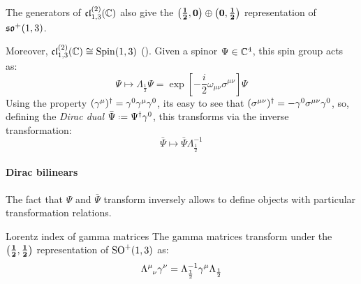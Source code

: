 \begin{proposition}{}{}
  The generators of $ \mathfrak{cl}_{1,3}^{(2)}(\mathbb{C}) $ also give the $ \mathbf{\left( \frac{1}{2},0 \right)} \oplus \mathbf{\left( 0,\frac{1}{2} \right)} $ representation of $ \mathfrak{so}^+(1,3) $.
\end{proposition}

Moreover, $ \mathfrak{cl}_{1,3}^{(2)}(\mathbb{C}) \cong \operatorname{Spin}(1,3) $ (). Given a spinor $ \Psi \in \mathbb{C}^4 $, this spin group acts as:
\begin{equation*}
  \Psi \mapsto \Lambda_{\frac{1}{2}} \Psi = \exp \left[ -\frac{i}{2} \omega_{\mu \nu} \sigma^{\mu \nu} \right] \Psi
\end{equation*}
Using the property $ (\gamma^\mu)^\dagger = \gamma^0 \gamma^\mu \gamma^0 $, its easy to see that $ (\sigma^{\mu \nu})^\dagger = - \gamma^0 \sigma^{\mu \nu} \gamma^0 $, so, defining the \textit{Dirac dual} $ \bar{\Psi} \defeq \Psi\dg \gamma^0 $, this transforms via the inverse transformation:
\begin{equation*}
  \bar{\Psi} \mapsto \bar{\Psi} \Lambda_{\frac{1}{2}}^{-1}
\end{equation*}

\paragraph{Dirac bilinears}

The fact that $ \Psi $ and $ \bar{\Psi} $ transform inversely allows to define objects with particular transformation relations.

\begin{theorem}{Lorentz index of gamma matrices}{}
  The gamma matrices transform under the $ \mathbf{\left( \frac{1}{2},\frac{1}{2} \right)} $ representation of $ \mathrm{SO}^+(1,3) $ as:
  \begin{equation}
    \tensor{\Lambda}{^\mu_\nu} \gamma^\nu = \Lambda_{\frac{1}{2}}^{-1} \gamma^\mu \Lambda_{\frac{1}{2}}
    \label{eq:gamma-lor-tr}
  \end{equation}
\end{theorem}

